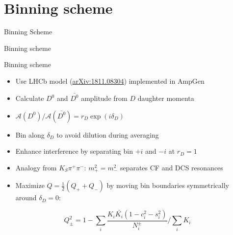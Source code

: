 \documentclass{beamer}
\begin{document}
\section{Binning scheme}
\begin{frame}{Binning Scheme}
  \begin{center}
    {\huge Binning scheme}
  \end{center}
\end{frame}

\begin{frame}{Binning scheme}
  \begin{itemize}
    \setlength\itemsep{1.2em}
    \item{Use LHCb model (\href{https://arxiv.org/abs/1811.08304}{arXiv:1811.08304}) implemented in AmpGen}
    \item{Calculate $D^0$ and $\bar{D^0}$ amplitude from $D$ daughter momenta}
    \item{$\mathcal{A}(D^0)/\mathcal{A}(\bar{D^0}) = r_D\exp(i\delta_D)$}
    \item{Bin along $\delta_D$ to avoid dilution during averaging}
    \item{Enhance interference by separating bin $+i$ and $-i$ at $r_D = 1$}
    \item{Analogy from $K_S\pi^+\pi^-$: $m^2_+ = m^2_-$ separates CF and DCS resonances}
    \item{Maximize $Q = \frac{1}{2}(Q_+ + Q_-)$ by moving bin boundaries symmetrically around $\delta_D = 0$:}
  \end{itemize}
  \begin{equation*}
    Q_\pm^2 = 1 - \sum_i\frac{K_i\bar{K_i}(1 - c_i^2 - s_i^2)}{N^\pm_i}\Big/\sum_iK_i
  \end{equation*}
\end{frame}
\end{document}
